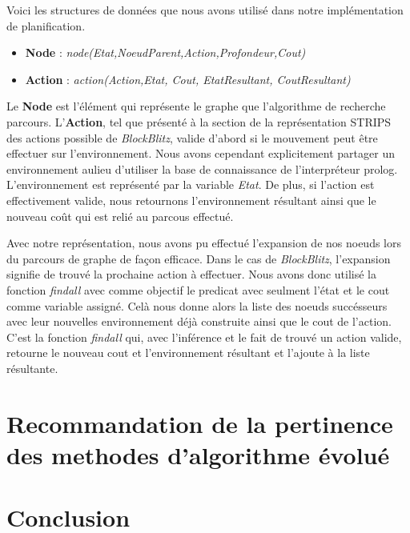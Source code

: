 \documentclass[12pt,english,frenchb,letterpaper]{article}
\begin{document}
Voici les structures de données que nous avons utilisé dans notre implémentation de planification.

\begin{itemize}
\item \textbf{Node} : \textit{node(Etat,NoeudParent,Action,Profondeur,Cout)}
\item \textbf{Action} : \textit{action(Action,Etat, Cout, EtatResultant, CoutResultant)}
\end{itemize}

Le \textbf{Node} est l'élément qui représente le graphe que l'algorithme de recherche parcours. L'\textbf{Action}, tel que présenté à la section de la représentation STRIPS des actions possible de \textit{BlockBlitz}, valide d'abord si le mouvement peut être effectuer sur l'environnement. Nous avons cependant explicitement partager un environnement aulieu d'utiliser la base de connaissance de l'interpréteur prolog. L'environnement est représenté par la variable \textit{Etat}. De plus, si l'action est effectivement valide, nous retournons l'environnement résultant ainsi que le nouveau coût qui est relié au parcous effectué.

Avec notre représentation, nous avons pu effectué l'expansion de nos noeuds lors du parcours de graphe de façon efficace. Dans le cas de \textit{BlockBlitz}, l'expansion signifie de trouvé la prochaine action à effectuer. Nous avons donc utilisé la fonction \textit{findall} avec comme objectif le predicat avec seulment l'état et le cout comme variable assigné. Celà nous donne alors la liste des noeuds succésseurs avec leur nouvelles environnement déjà construite ainsi que le cout de l'action. C'est la fonction \textit{findall} qui, avec l'inférence et le fait de trouvé un action valide, retourne le nouveau cout et l'environnement résultant et l'ajoute à la liste résultante.


\section{Recommandation de la pertinence des methodes d'algorithme évolué}

\section{Conclusion}
\end{document}

